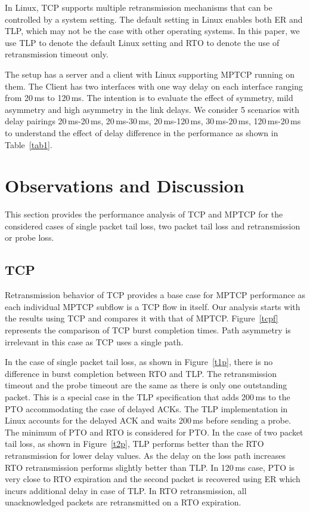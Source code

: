 \documentclass[10pt,conference]{IEEEtran}
\begin{document}
In Linux, TCP supports multiple retransmission mechanisms that can be controlled by a system setting. The default setting in Linux enables both
ER and TLP, which may not be the case with other operating systems. In this paper, we use TLP to denote the default Linux setting and RTO to denote
the use of retransmission timeout only.


The setup has a server and a client with Linux supporting MPTCP running on them. The Client has two interfaces with one way delay on each interface 
ranging from 20\,ms to 120\,ms. The intention is to evaluate the effect of symmetry, mild asymmetry and high asymmetry in the link delays. We 
consider 5 scenarios with delay pairings 20\,ms-20\,ms, 20\,ms-30\,ms, 20\,ms-120\,ms, 30\,ms-20\,ms, 120\,ms-20\,ms to understand the effect of
delay difference in the performance as shown in Table~\ref{tab1}.


\section{Observations and Discussion}\label{disc}
This section provides the performance analysis of TCP and MPTCP for the considered cases of single packet tail loss, two packet tail loss and 
retransmission or probe loss.
\subsection{TCP}
Retransmission behavior of TCP provides a base case for MPTCP performance as each individual MPTCP subflow is a TCP flow in itself. Our analysis
starts with the results using TCP and compares it with that of MPTCP. Figure~\ref{tcpf} represents the comparison of TCP burst completion times. Path
asymmetry is irrelevant in this case as TCP uses a single path.

In the case of single packet tail loss, as shown in Figure~\ref{t1p}, there is no difference in burst completion between RTO and TLP. The 
retransmission timeout and the probe timeout are the same as there is only one outstanding packet. This is a special case in the TLP
specification that adds 200\,ms to the PTO accommodating the case of delayed ACKs. The TLP implementation in Linux accounts for the delayed 
ACK and waits 200\,ms before sending a probe. The minimum of PTO and RTO is considered for PTO. In the case of two packet tail loss, as shown 
in Figure~\ref{t2p}, TLP performs better than the RTO retransmission for lower delay values. As the delay on the loss path increases RTO retransmission performs 
slightly better than TLP. In 120\,ms case, PTO is very close to RTO expiration and the second packet is recovered using ER which incurs additional 
delay in case of TLP. In RTO retransmission, all unacknowledged packets are retransmitted on a RTO expiration. 
\end{document}
